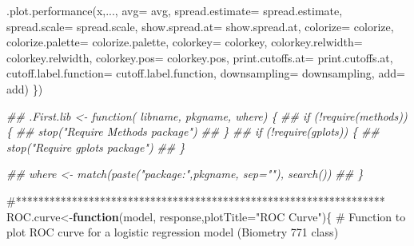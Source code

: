 \documentclass[
  letterpaper,
  DIV=11,
  numbers=noendperiod]{scrartcl}
\newenvironment{Shaded}{\begin{snugshade}}{\end{snugshade}}
\newcommand{\AttributeTok}[1]{\textcolor[rgb]{0.40,0.45,0.13}{#1}}
\newcommand{\CommentTok}[1]{\textcolor[rgb]{0.37,0.37,0.37}{#1}}
\newcommand{\ControlFlowTok}[1]{\textcolor[rgb]{0.00,0.23,0.31}{\textbf{#1}}}
\newcommand{\DocumentationTok}[1]{\textcolor[rgb]{0.37,0.37,0.37}{\textit{#1}}}
\newcommand{\FunctionTok}[1]{\textcolor[rgb]{0.28,0.35,0.67}{#1}}
\newcommand{\NormalTok}[1]{\textcolor[rgb]{0.00,0.23,0.31}{#1}}
\newcommand{\OtherTok}[1]{\textcolor[rgb]{0.00,0.23,0.31}{#1}}
\newcommand{\StringTok}[1]{\textcolor[rgb]{0.13,0.47,0.30}{#1}}
\begin{document}
\begin{Shaded}
\begin{Highlighting}[]
              \FunctionTok{.plot.performance}\NormalTok{(x,..., }
                                \AttributeTok{avg=}\NormalTok{ avg, }
                                \AttributeTok{spread.estimate=}\NormalTok{ spread.estimate,}
                                \AttributeTok{spread.scale=}\NormalTok{ spread.scale, }
                                \AttributeTok{show.spread.at=}\NormalTok{ show.spread.at, }
                                \AttributeTok{colorize=}\NormalTok{ colorize,}
                                \AttributeTok{colorize.palette=}\NormalTok{ colorize.palette,}
                                \AttributeTok{colorkey=}\NormalTok{ colorkey, }
                                \AttributeTok{colorkey.relwidth=}\NormalTok{ colorkey.relwidth, }
                                \AttributeTok{colorkey.pos=}\NormalTok{ colorkey.pos,}
                                \AttributeTok{print.cutoffs.at=}\NormalTok{ print.cutoffs.at, }
                                \AttributeTok{cutoff.label.function=}\NormalTok{ cutoff.label.function,}
                                \AttributeTok{downsampling=}\NormalTok{ downsampling, }
                                \AttributeTok{add=}\NormalTok{ add)}
\NormalTok{          \})}


\DocumentationTok{\#\# .First.lib \textless{}{-} function( libname, pkgname, where) \{}
\DocumentationTok{\#\#     if (!require(methods)) \{}
\DocumentationTok{\#\#         stop("Require Methods package")}
\DocumentationTok{\#\#     \}}
\DocumentationTok{\#\#     if (!require(gplots)) \{}
\DocumentationTok{\#\#         stop("Require gplots package")}
\DocumentationTok{\#\#     \}}
    
\DocumentationTok{\#\#     where \textless{}{-} match(paste("package:",pkgname, sep=""), search())}
\DocumentationTok{\#\# \}}

\CommentTok{\#******************************************************************}
\NormalTok{ROC.curve}\OtherTok{\textless{}{-}}\ControlFlowTok{function}\NormalTok{(model, response,}\AttributeTok{plotTitle=}\StringTok{"ROC Curve"}\NormalTok{)\{}
  \CommentTok{\# Function to plot ROC curve for a logistic regression model (Biometry 771 class)}


\end{Highlighting}
\end{Shaded}
\end{document}
